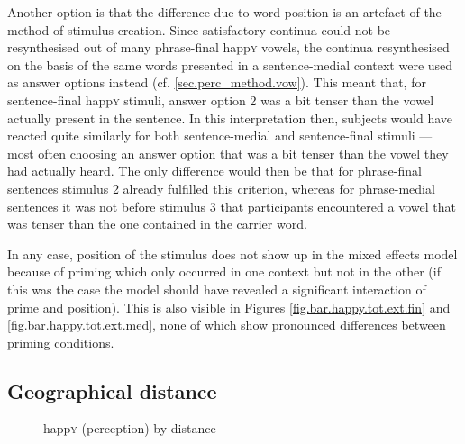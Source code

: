 Another option is that the difference due to word position is an artefact of the method of stimulus creation.
Since satisfactory continua could not be resynthesised out of many phrase-final happ\textsc{y} vowels, the continua resynthesised on the basis of the same words presented in a sentence-medial context were used as answer options instead (cf. \ref{sec.perc_method.vow}).
This meant that, for sentence-final happ\textsc{y} stimuli, answer option 2 was a bit tenser than the vowel actually present in the sentence.
In this interpretation then, subjects would have reacted quite similarly for both sentence-medial and sentence-final stimuli --- most often choosing an answer option that was a bit tenser than the vowel they had actually heard.
The only difference would then be that for phrase-final sentences stimulus 2 already fulfilled this criterion, whereas for phrase-medial sentences it was not before stimulus 3 that participants encountered a vowel that was tenser than the one contained in the carrier word.

In any case, position of the stimulus does not show up in the mixed effects model because of priming which only occurred in one context but not in the other (if this was the case the model should have revealed a significant interaction of prime and position).
This is also visible in Figures \ref{fig.bar.happy.tot.ext.fin} and \ref{fig.bar.happy.tot.ext.med}, none of which show pronounced differences between priming conditions.

\subsection{Geographical distance}
\label{sec.perc_res.happy.geography}

\begin{figure}[h]
	\centering
		\resizebox{.49\linewidth}{!}{} 
	\caption{happ\textsc{y} (perception) by distance}
	\label{fig.scatter.happy.ext.dist}
\end{figure}

